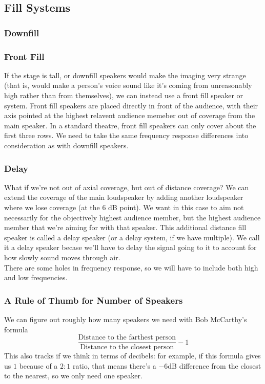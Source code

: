 \documentclass[a4paper]{article}
\begin{document}
\subsection{Fill Systems}
\subsubsection{Downfill}

\subsubsection{Front Fill}
If the stage is tall, or downfill speakers would make the imaging very strange
(that is, would make a person's voice sound like it's coming from unreasonably
high rather than from themselves), we can instead use a front fill speaker or
system. Front fill speakers are placed directly in front of the audience, with
their axis pointed at the highest relavent audience memeber out of coverage
from the main speaker. In a standard theatre, front fill speakers can only
cover about the first three rows. We need to take the same frequency response
differences into consideration as with downfill speakers.

\subsubsection{Delay}
What if we're not out of axial coverage, but out of distance coverage? We can
extend the coverage of the main loudspeaker by adding another loudspeaker where
we lose coverage (at the 6 dB point). We want in this case to aim not
necessarily for the objectively highest audience member, but the highest
audience member that we're aiming for with that speaker. This additional
distance fill speaker is called a delay speaker (or a delay system, if we have
multiple). We call it a delay speaker becase we'll have to delay the signal
going to it to account for how slowly sound moves through air.\\
There are some holes in frequency response, so we will have to include both
high %
and low frequencies.

\subsubsection{A Rule of Thumb for Number of Speakers}

We can figure out roughly how many speakers we need with Bob McCarthy's formula
\[
	\frac{\text{Distance to the farthest person}}{\text{Distance to the
	closest person}} - 1
\]
This also tracks if we think in terms of decibels: for example, if this formula
gives us $1$ because of a $2:1$ ratio, that means there's a $-6 \mathrm{dB}$
difference from the closest to the nearest, so we only need one speaker.
\end{document}
